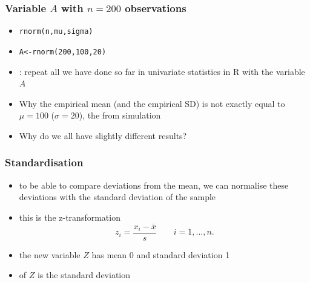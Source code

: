 \documentclass[extsize,handout,10pt]{beamer}\usepackage[]{graphicx}\usepackage[]{color}
\makeatletter
\newcommand{\hlnum}[1]{\textcolor[rgb]{0.502,0.086,1}{#1}}%
\newcommand{\hlstd}[1]{\textcolor[rgb]{0.251,0.251,0.251}{#1}}%
\newcommand{\hlkwb}[1]{\textcolor[rgb]{0,0.439,0.902}{#1}}%
\newcommand{\hlkwd}[1]{\textcolor[rgb]{0.69,0.188,0.941}{#1}}%
\newenvironment{kframe}{%
 \def\at@end@of@kframe{}%
 \ifinner\ifhmode%
  \def\at@end@of@kframe{\end{minipage}}%
  \begin{minipage}{\columnwidth}%
 \fi\fi%
 \def\FrameCommand##1{\hskip\@totalleftmargin \hskip-\fboxsep
 \colorbox{shadecolor}{##1}\hskip-\fboxsep
     \hskip-\linewidth \hskip-\@totalleftmargin \hskip\columnwidth}%
 \MakeFramed {\advance\hsize-\width
   \@totalleftmargin\z@ \linewidth\hsize
   \@setminipage}}%
 {\par\unskip\endMakeFramed%
 \at@end@of@kframe}
\newenvironment{knitrout}{}{} %
\makeatother
\begin{document}
\begin{frame}[containsverbatim]
  \frametitle{Variable $A$ with $n=200$ observations}
  \begin{itemize}
  \item \texttt{rnorm(n,mu,sigma)} 
  \item 

\begin{knitrout}\tiny
{}\color{fgcolor}\begin{kframe}
\begin{alltt}
\hlstd{A} \hlkwb{<-} \hlkwd{rnorm}\hlstd{(}\hlnum{200}\hlstd{,}\hlnum{100}\hlstd{,}\hlnum{20}\hlstd{)}
\end{alltt}
\end{kframe}
\end{knitrout}

\item {}: repeat all we have done so far in univariate
  statistics in \textsf{R} with the variable $A$



\item Why the empirical mean (and the empirical SD) is not exactly
  equal to $\mu=100$ ($\sigma=20$), the  from simulation 
\item Why do we all have slightly different results?
\end{itemize}
\end{frame}
  
  



  \begin{frame}
    \frametitle{Standardisation}
    \begin{itemize}
    \item<1-> to be able to \alert{compare} deviations from the mean,
      we can normalise these deviations with the standard deviation of
      the sample
    \item<2-> this is the \alert{z-transformation}
      \begin{equation*}
        z_i=\frac{x_i-\bar{x}}{s} \qquad    i=1,...,n.
        \label{zTrans}
      \end{equation*}
    \item<3-> the new variable $Z$ has mean 0 and standard deviation 1
    \item<4->  of $Z$ is the standard deviation
    \end{itemize}
  \end{frame}
\end{document}
